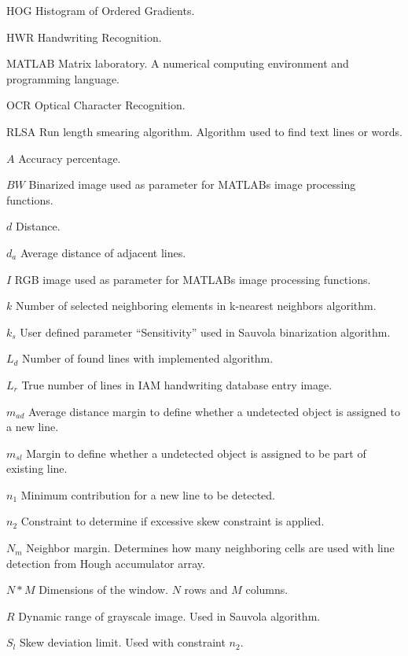 \documentclass{article}
\begin{document}
   \begin{abbrv}
    \item[HOG] Histogram of Ordered Gradients.
    \item[HWR] Handwriting Recognition.
    \item[MATLAB] Matrix laboratory. A numerical computing environment and programming language.
    \item[OCR] Optical Character Recognition.
    \item[RLSA] Run length smearing algorithm. Algorithm used to find text lines or words.

    \item[$A$] Accuracy percentage.
    \item[$BW$] Binarized image used as parameter for MATLABs image processing functions.
    \item[$d$] Distance.
    \item[$d_a$] Average distance of adjacent lines.
    \item[$I$] RGB image used as parameter for MATLABs image processing functions.
    \item[$k$] Number of selected neighboring elements in k-nearest neighbors algorithm.
    \item[$k_s$] User defined parameter ``Sensitivity'' used in Sauvola binarization algorithm.
    \item[$L_d$] Number of found lines with implemented algorithm.
    \item[$L_r$] True number of lines in IAM handwriting database entry image.
    \item[$m_{ad}$] Average distance margin to define whether a undetected object is assigned to a new line.
    \item[$m_{sl}$] Margin to define whether a undetected object is assigned to be part of existing line.
    \item[$n_1$] Minimum contribution for a new line to be detected.
    \item[$n_2$] Constraint to determine if excessive skew constraint is applied.
    \item[$N_m$] Neighbor margin. Determines how many neighboring cells are used with line detection from Hough accumulator array.
    \item[$N * M$] Dimensions of the window. $N$ rows and $M$ columns.
    \item[$R$] Dynamic range of grayscale image. Used in Sauvola algorithm.
    \item[$S_l$] Skew deviation limit. Used with constraint $n_2$.

\end{abbrv}
\end{document}
